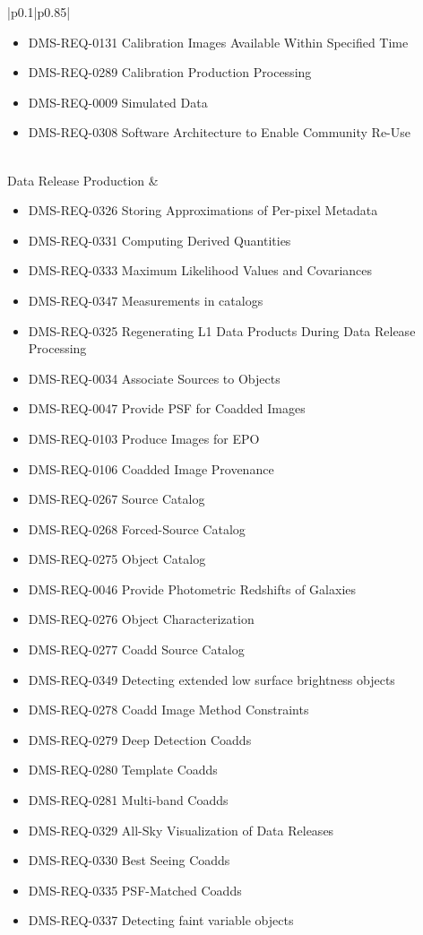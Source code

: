 \documentclass[DM,lsstdraft,toc]{lsstdoc}
\begin{document}
\begin{xtabular}{|p{0.1\textwidth}|p{0.85\textwidth}|}
\begin{itemize}
\item DMS-REQ-0131 Calibration Images Available Within Specified Time
\item DMS-REQ-0289 Calibration Production Processing
\item DMS-REQ-0009 Simulated Data
\item DMS-REQ-0308 Software Architecture to Enable Community Re-Use \end{itemize} \\ \hline
Data Release Production &
\begin{itemize} \item DMS-REQ-0326 Storing Approximations of Per-pixel Metadata
\item DMS-REQ-0331 Computing Derived Quantities
\item DMS-REQ-0333 Maximum Likelihood Values and Covariances
\item DMS-REQ-0347 Measurements in catalogs
\item DMS-REQ-0325 Regenerating L1 Data Products During Data Release Processing
\item DMS-REQ-0034 Associate Sources to Objects
\item DMS-REQ-0047 Provide PSF for Coadded Images
\item DMS-REQ-0103 Produce Images for EPO
\item DMS-REQ-0106 Coadded Image Provenance
\item DMS-REQ-0267 Source Catalog
\item DMS-REQ-0268 Forced-Source Catalog
\item DMS-REQ-0275 Object Catalog
\item DMS-REQ-0046 Provide Photometric Redshifts of Galaxies
\item DMS-REQ-0276 Object Characterization
\item DMS-REQ-0277 Coadd Source Catalog
\item DMS-REQ-0349 Detecting extended low surface brightness objects
\item DMS-REQ-0278 Coadd Image Method Constraints
\item DMS-REQ-0279 Deep Detection Coadds
\item DMS-REQ-0280 Template Coadds
\item DMS-REQ-0281 Multi-band Coadds
\item DMS-REQ-0329 All-Sky Visualization of Data Releases
\item DMS-REQ-0330 Best Seeing Coadds
\item DMS-REQ-0335 PSF-Matched Coadds
\item DMS-REQ-0337 Detecting faint variable objects

\end{itemize}
\end{xtabular}
\end{document}
